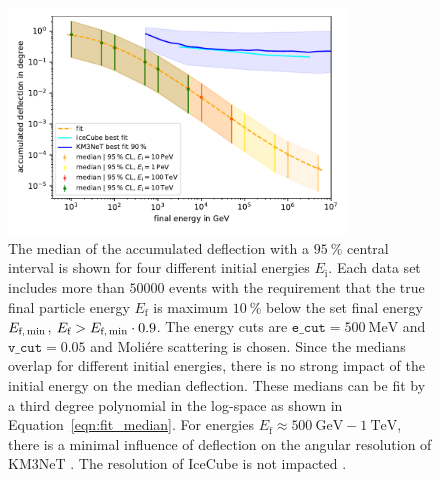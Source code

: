 \begin{figure}
    \centering 
    \includegraphics[width=0.8\textwidth]{figures/fit_median_defl_cut_10percent_only_poly.pdf}
    \caption{The median of the accumulated deflection with a $\SI{95}{\percent}$ 
    central interval is shown for four different initial energies $E_{\text{i}}$. 
    Each data set includes more than $\num{50000}$ events with the requirement 
    that the true final particle energy $E_{\text{f}}$ is maximum 
    $\SI{10}{\percent}$ below the set final energy $E_{\text{f,\,min}}$,   
    $E_{\text{f}} > E_{\text{f,\,min}} \cdot 0.9$. The energy cuts are $\texttt{e\_cut} = \SI{500}{\mega\electronvolt}$ and $\texttt{v\_cut} = 0.05$ and 
    Moliére scattering is chosen. 
    Since the medians overlap for different initial energies, there is no 
    strong impact of the initial energy on the median deflection. These 
    medians can be fit by a third degree polynomial in the log-space as 
    shown in Equation~\ref{eqn:fit_median}. For energies 
    $E_{\text{f}} \approx \SI{500}{\giga\electronvolt} - \SI{1}{\tera\electronvolt}$, there is a minimal influence of deflection on the angular resolution of 
    KM3NeT \cite{KM3NeT_Resolution2016}. The resolution of IceCube is not 
    impacted \cite{IceCube_Resolution2021}.}
    \label{fig:fit_median}
\end{figure}